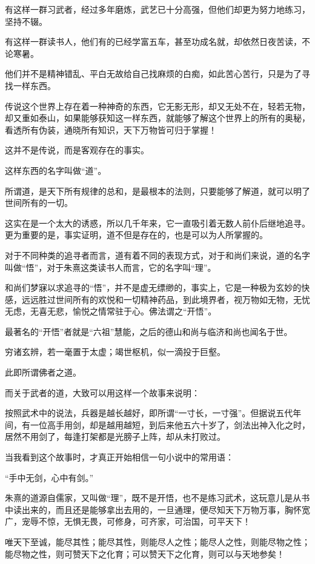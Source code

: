 \begin{multicols}{\theparacolNo}
		有这样一群习武者，经过多年磨炼，武艺已十分高强，但他们却更为努力地练习，坚持不辍。

		有这样一群读书人，他们有的已经学富五车，甚至功成名就，却依然日夜苦读，不论寒暑。

		他们并不是精神错乱、平白无故给自己找麻烦的白痴，如此苦心苦行，只是为了寻找一样东西。

		传说这个世界上存在着一种神奇的东西，它无影无形，却又无处不在，轻若无物，却又重如泰山，如果能够获知这一样东西，就能够了解这个世界上的所有的奥秘，看透所有伪装，通晓所有知识，天下万物皆可归于掌握！

		这并不是传说，而是客观存在的事实。

		这样东西的名字叫做“道”。

		所谓道，是天下所有规律的总和，是最根本的法则，只要能够了解道，就可以明了世间所有的一切。

		这实在是一个太大的诱惑，所以几千年来，它一直吸引着无数人前仆后继地追寻。更为重要的是，事实证明，道不但是存在的，也是可以为人所掌握的。

		对于不同种类的追寻者而言，道有着不同的表现方式，对于和尚们来说，道的名字叫做“悟”，对于朱熹这类读书人而言，它的名字叫“理”。

		和尚们梦寐以求追寻的“悟”，并不是虚无缥缈的，事实上，它是一种极为玄妙的快感，远远胜过世间所有的欢悦和一切精神药品，到此境界者，视万物如无物，无忧无虑，无喜无悲，愉悦之情常驻于心。佛法谓之“开悟”。

		最著名的“开悟”者就是“六祖”慧能，之后的德山和尚与临济和尚也闻名于世。

		穷诸玄辨，若一毫置于太虚；竭世枢机，似一滴投于巨壑。

		此即所谓佛者之道。

		而关于武者的道，大致可以用这样一个故事来说明：

		按照武术中的说法，兵器是越长越好，即所谓“一寸长，一寸强”。但据说五代年间，有一位高手用剑，却是越用越短，到后来他五六十岁了，剑法出神入化之时，居然不用剑了，每逢打架都是光膀子上阵，却从未打败过。

		当我看到这个故事时，才真正开始相信一句小说中的常用语：

		“手中无剑，心中有剑。”

		朱熹的道源自儒家，又叫做“理”，既不是开悟，也不是练习武术，这玩意儿是从书中读出来的，而且还是能够拿出去用的，一旦通理，便尽知天下万物万事，胸怀宽广，宠辱不惊，无惧无畏，可修身，可齐家，可治国，可平天下！

		唯天下至诚，能尽其性；能尽其性，则能尽人之性；能尽人之性，则能尽物之性；能尽物之性，则可赞天下之化育；可以赞天下之化育，则可以与天地参矣！


\end{multicols}
